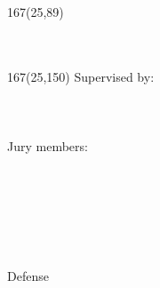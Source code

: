 \begin{titlepage}

\setlength{\TPHorizModule}{1mm}
\setlength{\TPVertModule}{\TPHorizModule}
\newlength{\backupparindent}
\setlength{\backupparindent}{\parindent}
\setlength{\parindent}{0mm}			
\begin{textblock}{167}(25,89)
    \vspace*{1mm}
    \huge
    \textbf{\doctitle \\}
    \Large
    \vspace*{5mm}
    \textit{\docsubtitle}\\
    \vspace*{10mm}
    \Large
    \me\\
\end{textblock}

\begin{textblock}{167}(25,150)
	\Large
	Supervised by: \\
    \hspace*{5cm}\firstSupervisor\\
     \hspace*{5cm}\secondSupervisor\\
     \hspace*{5cm}\thirdSupervisor\\
     
     \vspace*{1cm}
     Jury members:\\
     \hspace*{5cm}\firstCommitteeMember\\
	 \hspace*{5cm}\secondCommitteeMember\\
	 \hspace*{5cm}\thirdCommitteeMember\\
	 \hspace*{5cm}\fourthCommitteeMember\\
	 

\end{textblock}

\mbox{~} %
\vfill 
\begin{center}
\large
Defense \monthYear\\
\end{center}

\setlength{\parindent}{\backupparindent}

\end{titlepage} 